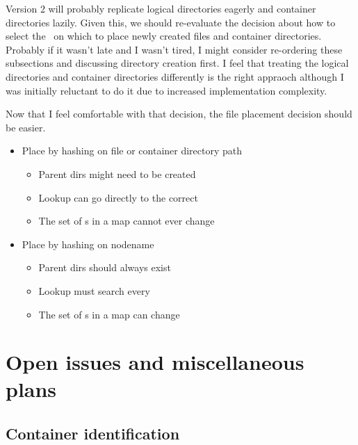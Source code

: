 \documentclass[10pt]{article}
\begin{document}
Version 2 will probably replicate logical directories eagerly and
container directories lazily.  Given this, we should re-evaluate the
decision about how to select the \store\ on which to place newly created
files and container directories.  Probably if it wasn't late and I wasn't
tired, I might consider re-ordering these subsections and discussing 
directory creation first.  I feel that treating the logical directories and
container directories differently is the right appraoch although I was
initially reluctant to do it due to increased implementation complexity.

Now that I feel comfortable with that decision, the file placement decision
should be easier.  

\begin{itemize}
\item{Place by hashing on file or container directory path}
\begin{itemize}
\item{Parent dirs might need to be created}
\item{Lookup can go directly to the correct \store}
\item{The set of {\store}s in a map cannot ever change}
\end{itemize}
\item{Place by hashing on nodename}
\begin{itemize}
\item{Parent dirs should always exist}
\item{Lookup must search every \store}
\item{The set of {\store}s in a map can change}
\end{itemize}
\end{itemize}


\section{Open issues and miscellaneous plans}

\subsection{Container identification}
\end{document}
